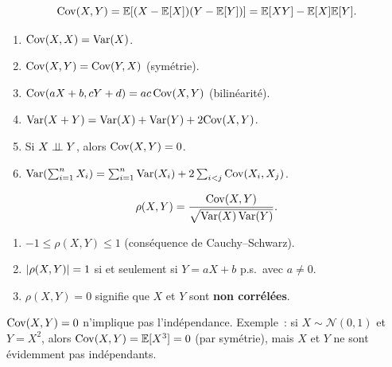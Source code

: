 \begin{definition}[Covariance]
\[
    \mathrm{Cov}(X, Y) = \mathbb{E}[(X - \mathbb{E}[X])(Y - \mathbb{E}[Y])] = \mathbb{E}[XY] - \mathbb{E}[X]\mathbb{E}[Y].
\]
\end{definition}

\begin{proposition}
\begin{enumerate}[label=(\roman*)]
    \item $\mathrm{Cov}(X, X) = \mathrm{Var}(X)$.
    \item $\mathrm{Cov}(X, Y) = \mathrm{Cov}(Y, X)$ (sym\'etrie).
    \item $\mathrm{Cov}(aX + b, cY + d) = ac\, \mathrm{Cov}(X, Y)$ (bilin\'earit\'e).
    \item $\mathrm{Var}(X + Y) = \mathrm{Var}(X) + \mathrm{Var}(Y) + 2\mathrm{Cov}(X, Y)$.
    \item Si $X \perp\!\!\!\perp Y$, alors $\mathrm{Cov}(X, Y) = 0$.
    \item $\mathrm{Var}\!\left(\sum_{i=1}^n X_i\right) = \sum_{i=1}^n \mathrm{Var}(X_i)
          + 2\sum_{i < j} \mathrm{Cov}(X_i, X_j)$.
\end{enumerate}
\end{proposition}

\begin{definition}
\[
    \rho(X, Y) = \frac{\mathrm{Cov}(X, Y)}{\sqrt{\mathrm{Var}(X)\, \mathrm{Var}(Y)}}.
\]
\end{definition}

\begin{theoreme}
\begin{enumerate}[label=(\roman*)]
    \item $-1 \leq \rho(X, Y) \leq 1$ \quad (cons\'equence de Cauchy--Schwarz).
    \item $\left| \rho(X,Y) \right| = 1$ si et seulement si $Y = aX + b$ p.s.\ avec
          $a \neq 0$.
    \item $\rho(X,Y) = 0$ signifie que $X$ et $Y$ sont \textbf{non corr\'el\'ees}.
\end{enumerate}
\end{theoreme}

\begin{attention}[title=\textbf{Non corr\'el\'e $\neq$ ind\'ependant}]
$\mathrm{Cov}(X,Y) = 0$ n'implique pas l'ind\'ependance. Exemple~: si $X \sim \mathcal{N}(0,1)$
et $Y = X^2$, alors $\mathrm{Cov}(X, Y) = \mathbb{E}[X^3] = 0$ (par sym\'etrie), mais $X$ et $Y$
ne sont \'evidemment pas ind\'ependants.
\end{attention}

